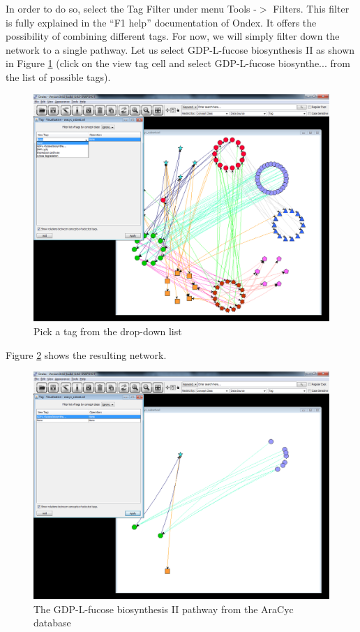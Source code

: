 In order to do so, select the Tag Filter under menu Tools -$>$ Filters.
This filter is fully explained in the ``F1 help'' documentation of Ondex.
It offers the possibility of combining different tags.
For now, we will simply filter down the network to a single pathway.
Let us select GDP-L-fucose biosynthesis II as shown in Figure \ref{fig:aracyc_pick_tag}
(click on the view tag cell and select GDP-L-fucose biosynthe... from the list of possible tags).

\begin{figure}[H]
\centering
\includegraphics[scale=0.3]{images/Jun12/aracyc_pick_tag.png} 
\caption{Pick a tag from the drop-down list}
\label{fig:aracyc_pick_tag}
\end{figure}

Figure \ref{fig:aracyc_gdp_fucose_II} shows the resulting network.
\begin{figure}[H]
\centering
\includegraphics[scale=0.3]{images/Jun12/aracyc_gdp_fucose_II.png} 
\caption{The GDP-L-fucose biosynthesis II pathway from the AraCyc database}
\label{fig:aracyc_gdp_fucose_II}
\end{figure}


